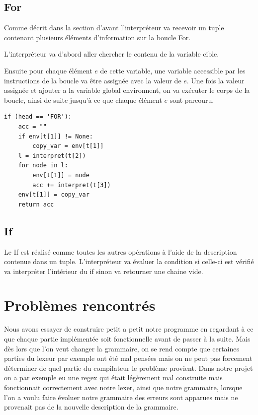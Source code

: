 \documentclass[10pt,a4paper]{article}
\begin{document}
\subsection{For}
Comme décrit dans la section d'avant l'interpréteur va recevoir un tuple contenant plusieurs éléments d'information sur
la boucle For.

L'interpréteur va d'abord aller chercher le contenu de la variable cible.

Ensuite pour chaque élément $e$ de cette variable, une variable accessible par les instructions de la boucle va être assignée avec la valeur de $e$.
Une fois la valeur assignée et ajouter a la variable global environnent, on va exécuter le corps de la boucle, ainsi de suite jusqu'à ce que chaque élément $e$ sont parcouru.
\begin{lstlisting}
if (head == 'FOR'):
	acc = ""
	if env[t[1]] != None:
		copy_var = env[t[1]]
	l = interpret(t[2])
	for node in l:
		env[t[1]] = node
		acc += interpret(t[3])
	env[t[1]] = copy_var
	return acc
\end{lstlisting}
\subsection{If}
Le If est réalisé comme toutes les autres opérations à l'aide de la description contenue dans un tuple.
L'interpréteur va évaluer la condition si celle-ci est vérifié va interpréter l'intérieur du if sinon va retourner une chaine vide.
\section{Problèmes rencontrés}
Nous avons essayer de construire petit a petit notre programme en regardant à ce que chaque partie implémentée soit fonctionnelle avant de passer à la suite.
Mais dès lors que l'on veut changer la grammaire, on se rend compte que certaines parties du lexeur par exemple ont été mal pensées mais on ne peut pas forcement déterminer de quel partie du compilateur le problème provient.
Dans notre projet on a par exemple eu une regex qui était légèrement mal construite mais fonctionnait correctement avec notre lexer, ainsi que notre grammaire, lorsque l'on a voulu faire évoluer notre grammaire des erreurs sont apparues mais ne provenait pas de la nouvelle description de la grammaire.
\end{document}
